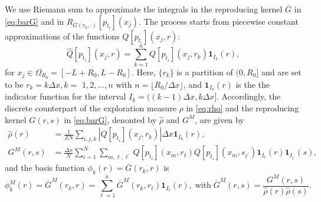 \documentclass[12pt]{article}
\def\Gbar{ {\overline{G}} }
\newcommand{\floor}[1]{\lfloor{#1}\rfloor}
\numberwithin{equation}{section}
\numberwithin{theorem}{section}
\begin{document}
We use Riemann sum to approximate the integrals in the reproducing kernel $\Gbar$ in \eqref{eq:barG} and in $R_{\Gbar(r_k,\cdot)}[p_{t_i}](x_j)$. The process starts from piecewise constant approximations of the functions $Q\left[p_{t_i}\right]\left(x_j, r\right)$:  
\begin{equation}
\label{eq: discreteQ}   
\widehat{Q}\left[p_{t_i}\right]\left(x_j, r\right)=\sum_{k=1}^n Q\left[p_{t_i}\right]\left(x_j, r_k\right) \mathbf{1}_{I_k}(r),
\end{equation}
for $x_j\in \Omega_{R_0}=\left[-L+R_0, L-R_0\right]$. Here, $\{r_k\}$ is a partition of $(0,R_0]$ and are set to be $r_k=k \Delta x, k=$ $1,2, \ldots, n$ with $n=\floor{R_0/\Delta x}$, and $\mathbf{1}_{I_k}(r)$ is the the indicator function  for the interval $I_k=((k-1) \Delta x, k \Delta x]$. Accordingly, the discrete counterpart of the exploration measure $\rho$ in \eqref{eq:rho} and the reproducing kernel $G(r, s)$ in \eqref{eq:barG}, denonted by $\widehat{\rho}$ and $G^M$, are given by
\begin{equation}
\label{eq: discreteG}
\begin{aligned}
\widehat{\rho}(r) &= \frac{1}{Z N} \sum_{i, j, k}\left|Q\left[p_{t_i}\right]\left(x_j, r_k\right)\right| \Delta x \mathbf{1}_{I_k}(r),\\
G^M(r, s) & =\frac{\Delta x}{N} \sum_{i=1}^N \sum_{m, \ell, \ell^{'}} Q\left[p_{t_i}\right]\left(x_m, r_{\ell}\right) Q\left[p_{t_i}\right]\left(x_m, s_{\ell^{'}}\right) \mathbf{1}_{I_{\ell}}\left(r\right) \mathbf{1}_{I_{\ell^{'}}}\left(s\right), 
\end{aligned}
\end{equation}
and the basis function $\phi_k(r)= \Gbar(r_k,r)$ is 
\begin{equation}
\label{eq:disbasis}   
\phi_k^M(r)=\Gbar^M\left(r_k, r\right)=\sum_{\ell=1}^n \Gbar^M\left(r_k, r_{\ell}\right) \mathbf{1}_{I_{\ell}}(r), \;\text{with}\; \Gbar^M(r, s)  =\frac{G^M(r, s)}{\widehat{\rho}(r) \widehat{\rho}(s)}.
\end{equation}
\end{document}
